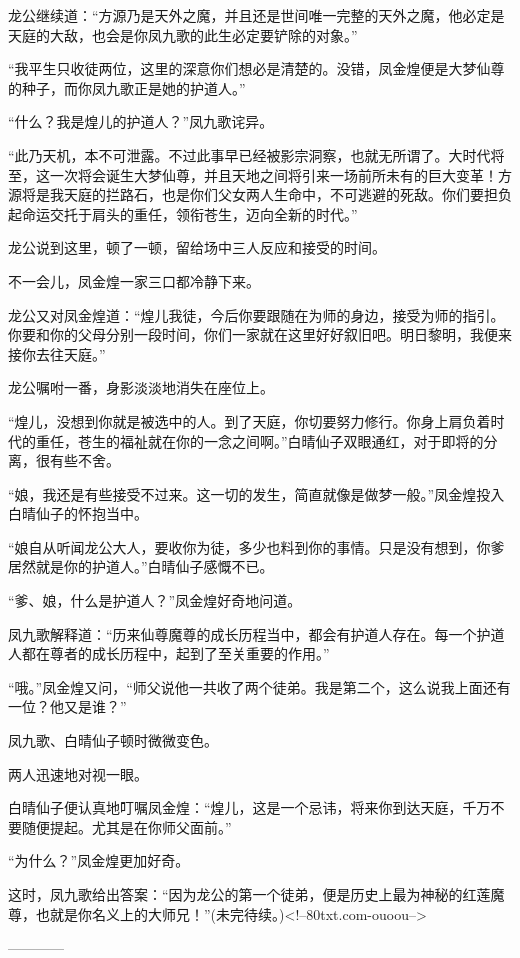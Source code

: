 \begin{this_body}
龙公继续道：“方源乃是天外之魔，并且还是世间唯一完整的天外之魔，他必定是天庭的大敌，也会是你凤九歌的此生必定要铲除的对象。”

“我平生只收徒两位，这里的深意你们想必是清楚的。没错，凤金煌便是大梦仙尊的种子，而你凤九歌正是她的护道人。”

“什么？我是煌儿的护道人？”凤九歌诧异。

“此乃天机，本不可泄露。不过此事早已经被影宗洞察，也就无所谓了。大时代将至，这一次将会诞生大梦仙尊，并且天地之间将引来一场前所未有的巨大变革！方源将是我天庭的拦路石，也是你们父女两人生命中，不可逃避的死敌。你们要担负起命运交托于肩头的重任，领衔苍生，迈向全新的时代。”

龙公说到这里，顿了一顿，留给场中三人反应和接受的时间。

不一会儿，凤金煌一家三口都冷静下来。

龙公又对凤金煌道：“煌儿我徒，今后你要跟随在为师的身边，接受为师的指引。你要和你的父母分别一段时间，你们一家就在这里好好叙旧吧。明日黎明，我便来接你去往天庭。”

龙公嘱咐一番，身影淡淡地消失在座位上。

“煌儿，没想到你就是被选中的人。到了天庭，你切要努力修行。你身上肩负着时代的重任，苍生的福祉就在你的一念之间啊。”白晴仙子双眼通红，对于即将的分离，很有些不舍。

“娘，我还是有些接受不过来。这一切的发生，简直就像是做梦一般。”凤金煌投入白晴仙子的怀抱当中。

“娘自从听闻龙公大人，要收你为徒，多少也料到你的事情。只是没有想到，你爹居然就是你的护道人。”白晴仙子感慨不已。

“爹、娘，什么是护道人？”凤金煌好奇地问道。

凤九歌解释道：“历来仙尊魔尊的成长历程当中，都会有护道人存在。每一个护道人都在尊者的成长历程中，起到了至关重要的作用。”

“哦。”凤金煌又问，“师父说他一共收了两个徒弟。我是第二个，这么说我上面还有一位？他又是谁？”

凤九歌、白晴仙子顿时微微变色。

两人迅速地对视一眼。

白晴仙子便认真地叮嘱凤金煌：“煌儿，这是一个忌讳，将来你到达天庭，千万不要随便提起。尤其是在你师父面前。”

“为什么？”凤金煌更加好奇。

这时，凤九歌给出答案：“因为龙公的第一个徒弟，便是历史上最为神秘的红莲魔尊，也就是你名义上的大师兄！”(未完待续。)<!--80txt.com-ouoou-->

------------

\end{this_body}

